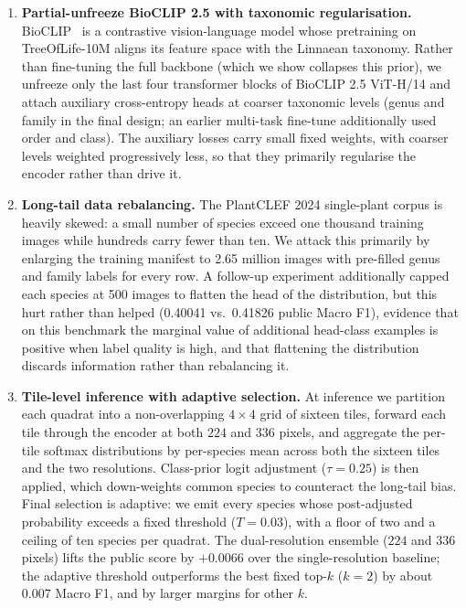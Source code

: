 \begin{enumerate}
  \item \textbf{Partial-unfreeze BioCLIP 2.5 with taxonomic regularisation.} BioCLIP~\cite{stevens2024bioclip} is a contrastive vision-language model whose pretraining on TreeOfLife-10M aligns its feature space with the Linnaean taxonomy. Rather than fine-tuning the full backbone (which we show collapses this prior), we unfreeze only the last four transformer blocks of BioCLIP 2.5 ViT-H/14 and attach auxiliary cross-entropy heads at coarser taxonomic levels (genus and family in the final design; an earlier multi-task fine-tune additionally used order and class). The auxiliary losses carry small fixed weights, with coarser levels weighted progressively less, so that they primarily regularise the encoder rather than drive it.
  \item \textbf{Long-tail data rebalancing.} The PlantCLEF 2024 single-plant corpus is heavily skewed: a small number of species exceed one thousand training images while hundreds carry fewer than ten. We attack this primarily by enlarging the training manifest to 2.65 million images with pre-filled genus and family labels for every row. A follow-up experiment additionally capped each species at 500 images to flatten the head of the distribution, but this hurt rather than helped (0.40041 vs.\ 0.41826 public Macro F1), evidence that on this benchmark the marginal value of additional head-class examples is positive when label quality is high, and that flattening the distribution discards information rather than rebalancing it.
  \item \textbf{Tile-level inference with adaptive selection.} At inference we partition each quadrat into a non-overlapping $4{\times}4$ grid of sixteen tiles, forward each tile through the encoder at both $224$ and $336$ pixels, and aggregate the per-tile softmax distributions by per-species mean across both the sixteen tiles and the two resolutions. Class-prior logit adjustment ($\tau{=}0.25$) is then applied, which down-weights common species to counteract the long-tail bias. Final selection is adaptive: we emit every species whose post-adjusted probability exceeds a fixed threshold ($T{=}0.03$), with a floor of two and a ceiling of ten species per quadrat. The dual-resolution ensemble ($224$ and $336$ pixels) lifts the public score by $+0.0066$ over the single-resolution baseline; the adaptive threshold outperforms the best fixed top-$k$ ($k{=}2$) by about $0.007$ Macro F1, and by larger margins for other $k$.
\end{enumerate}

